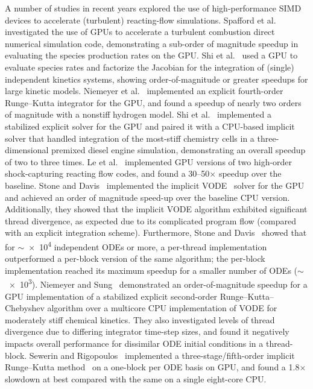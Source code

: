 \documentclass[preprint]{elsarticle}
\begin{document}
A number of studies in recent years explored the use of high-performance SIMD devices to accelerate (turbulent) reacting-flow simulations.
Spafford et al.~\cite{Spafford:2010aa} investigated the use of GPUs to accelerate a turbulent combustion direct numerical simulation code, demonstrating a sub-order of magnitude speedup in evaluating the species production rates on the GPU.
Shi et al.~\cite{Shi:2011aa} used a GPU to evaluate species rates and factorize the Jacobian for the integration of (single) independent kinetics systems, showing order-of-magnitude or greater speedups for large kinetic models.
Niemeyer et al.~\cite{Niemeyer:2011aa} implemented an explicit fourth-order Runge--Kutta integrator for the GPU, and found a speedup of nearly two orders of magnitude with a nonstiff hydrogen model.
Shi et al.~\cite{Shi:2012aa} implemented a stabilized explicit solver for the GPU and paired it with a CPU-based implicit solver that handled integration of the most-stiff chemistry cells in a three-dimensional premixed diesel engine simulation, demonstrating an overall speedup of two to three times.
Le et al.~\cite{Le2013596} implemented GPU versions of two high-order shock-capturing reacting flow codes, and found a \numrange{30}{50}$\times$ speedup over the baseline.
Stone and Davis~\cite{Stone:2013aa} implemented the implicit VODE~\cite{Brown:1989vl} solver for the GPU and achieved an order of magnitude speed-up over the baseline CPU version.
Additionally, they showed that the implicit VODE algorithm exhibited significant thread divergence, as expected due to its complicated program flow (compared with an explicit integration scheme).
Furthermore, Stone and Davis~\cite{Stone:2013aa} showed that for $\sim$\num{e4} independent ODEs or more, a per-thread implementation outperformed a per-block version of the same algorithm; the per-block implementation reached its maximum speedup for a smaller number of ODEs ($\sim$\num{e3}).
Niemeyer and Sung~\cite{Niemeyer:2014aa} demonstrated an order-of-magnitude speedup for a GPU implementation of a stabilized explicit second-order Runge--Kutta--Chebyshev algorithm over a multicore CPU implementation of VODE for moderately stiff chemical kinetics.
They also investigated levels of thread divergence due to differing integrator time-step sizes, and found it negatively impacts overall performance for dissimilar ODE initial conditions in a thread-block.
Sewerin and Rigopoulos~\cite{Sewerin20151375} implemented a three-stage\slash fifth-order implicit Runge--Kutta method~\cite{wanner1991solving} on a one-block per ODE basis on GPU, and found a \num{1.8}$\times$ slowdown at best compared with the same on a single eight-core CPU.
\end{document}
